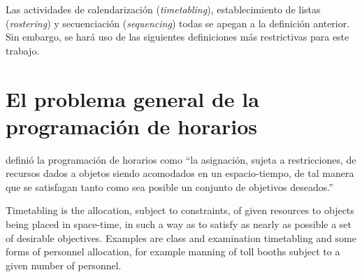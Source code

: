 \documentclass[draft,12pt,headsepline,footsepline,paper=letter]{scrreprt}
\begin{document}

Las actividades de calendarización (\textit{timetabling}), establecimiento de listas (\textit{rostering}) y secuenciación (\textit{sequencing}) todas se apegan a la definición anterior. Sin embargo, se hará uso de las siguientes definiciones más restrictivas para este trabajo.

\section{El problema general de la programación de horarios}
\label{sec:problema_general_programacion_horarios}

\citet[p.~53]{wren95scheduling-timetabling} definió la programación de horarios como “la asignación, sujeta a restricciones, de recursos dados a objetos siendo acomodados en un espacio-tiempo, de tal manera que se satisfagan tanto como sea posible un conjunto de objetivos deseados.”

\iffalse
Timetabling is the allocation, subject to constraints, of given resources to objects being placed in space-time, in such a way as to satisfy as nearly as possible a set of desirable objectives. Examples are class and examination timetabling and some forms of personnel allocation, for example manning of toll booths subject to a given number of personnel.
\end{document}
